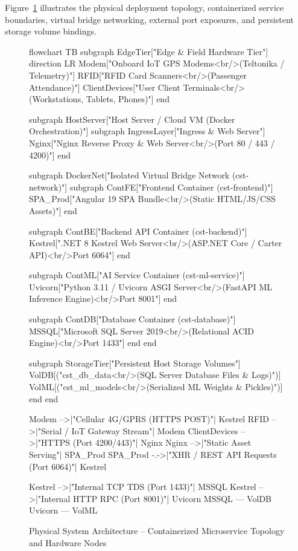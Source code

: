 Figure~\ref{fig:physical_architecture} illustrates the physical deployment topology, containerized service boundaries, virtual bridge networking, external port exposures, and persistent storage volume bindings.

\begin{figure}[H]
  \centering
  \begin{mermaid}[width=0.55\textwidth,height=0.78\textheight,keepaspectratio]
flowchart TB
    subgraph EdgeTier["Edge & Field Hardware Tier"]
        direction LR
        Modem["Onboard IoT GPS Modems<br/>(Teltonika / Telemetry)"]
        RFID["RFID Card Scanners<br/>(Passenger Attendance)"]
        ClientDevices["User Client Terminals<br/>(Workstations, Tablets, Phones)"]
    end

    subgraph HostServer["Host Server / Cloud VM (Docker Orchestration)"]
        subgraph IngressLayer["Ingress & Web Server"]
            Nginx["Nginx Reverse Proxy & Web Server<br/>(Port 80 / 443 / 4200)"]
        end

        subgraph DockerNet["Isolated Virtual Bridge Network (cst-network)"]
            subgraph ContFE["Frontend Container (cst-frontend)"]
                SPA_Prod["Angular 19 SPA Bundle<br/>(Static HTML/JS/CSS Assets)"]
            end

            subgraph ContBE["Backend API Container (cst-backend)"]
                Kestrel[".NET 8 Kestrel Web Server<br/>(ASP.NET Core / Carter API)<br/>Port 6064"]
            end

            subgraph ContML["AI Service Container (cst-ml-service)"]
                Uvicorn["Python 3.11 / Uvicorn ASGI Server<br/>(FastAPI ML Inference Engine)<br/>Port 8001"]
            end

            subgraph ContDB["Database Container (cst-database)"]
                MSSQL["Microsoft SQL Server 2019<br/>(Relational ACID Engine)<br/>Port 1433"]
            end
        end

        subgraph StorageTier["Persistent Host Storage Volumes"]
            VolDB[("cst_db_data<br/>(SQL Server Database Files & Logs)")]
            VolML[("cst_ml_models<br/>(Serialized ML Weights & Pickles)")]
        end
    end

    Modem -->|"Cellular 4G/GPRS (HTTPS POST)"| Kestrel
    RFID -->|"Serial / IoT Gateway Stream"| Modem
    ClientDevices -->|"HTTPS (Port 4200/443)"| Nginx
    Nginx -->|"Static Asset Serving"| SPA_Prod
    SPA_Prod -.->|"XHR / REST API Requests (Port 6064)"| Kestrel

    Kestrel -->|"Internal TCP TDS (Port 1433)"| MSSQL
    Kestrel -->|"Internal HTTP RPC (Port 8001)"| Uvicorn
    MSSQL --- VolDB
    Uvicorn --- VolML
  \end{mermaid}
  \caption{Physical System Architecture -- Containerized Microservice Topology and Hardware Nodes}
  \label{fig:physical_architecture}
\end{figure}

